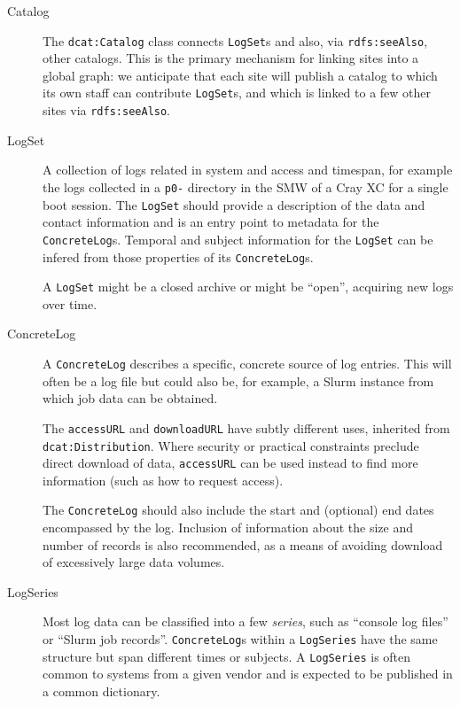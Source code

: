 \begin{description}
\item[Catalog] \hfill

The \texttt{dcat:Catalog} class connects \texttt{LogSet}s and also, via 
\texttt{rdfs:seeAlso}, other catalogs. This is the primary mechanism for 
linking sites into a global graph: we anticipate that each site will 
publish a catalog to which its own staff can contribute \texttt{LogSet}s, and which is linked to a few other sites via \texttt{rdfs:seeAlso}.

\item[LogSet] \hfill

A collection of logs related in system and access and timespan,
for example the logs collected in a \texttt{p0-} directory in the SMW of a Cray
XC for a single boot session. The \texttt{LogSet} should provide a description
of the data and contact information and is an entry point to metadata for 
the \texttt{ConcreteLog}s. Temporal and subject information for the \texttt{LogSet}
can be infered from those properties of its \texttt{ConcreteLog}s.

A \texttt{LogSet} might be a closed archive or might be ``open'',
acquiring new logs over time. 

\item[ConcreteLog] \hfill

A \texttt{ConcreteLog} describes a specific, concrete source of log entries.
This will often be a log file but could also be, for example, a Slurm instance
from which job data can be obtained. 

The \texttt{accessURL} and \texttt{downloadURL} have subtly different uses,
inherited from \texttt{dcat:Distribution}. Where security or practical 
constraints preclude direct download of data, \texttt{accessURL} can be used 
instead to find more information (such as how to request access).

The \texttt{ConcreteLog} should also include the 
start and (optional) end dates encompassed by the log. Inclusion of 
information about the size and number of records is also recommended, as a
means of avoiding download of excessively large data volumes.

\item[LogSeries] \hfill

Most log data can be classified into a few \emph{series}, such as 
``console log files'' or ``Slurm job records''. \texttt{ConcreteLog}s
within a \texttt{LogSeries} have the same structure but span different 
times or subjects. A \texttt{LogSeries} is often common to systems from a
given vendor and is expected to be published in a common dictionary.


\end{description}
